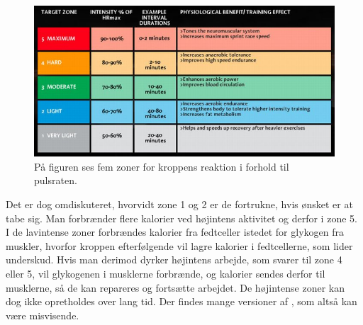 \begin{figure}[H]
	\centering
	\includegraphics[scale=1]{figures/aProblemanalyse/heart-rate-zones.jpg}
	\caption{På figuren ses fem zoner for kroppens reaktion i forhold til pulsraten.   \citep{Heartratejournal2015}}
	\label{fig:PA_Procentpuls}
\end{figure}
Det er dog omdiskuteret, hvorvidt zone 1 og 2 er de fortrukne, hvis ønsket er at tabe sig. Man forbrænder flere kalorier ved højintens aktivitet og derfor i zone 5. I de lavintense zoner forbrændes kalorier fra fedtceller istedet for glykogen fra muskler, hvorfor kroppen efterfølgende vil lagre kalorier i fedtcellerne, som lider underskud. Hvis man derimod dyrker højintens arbejde, som svarer til zone 4 eller 5, vil glykogenen i musklerne forbrænde, og kalorier sendes derfor til musklerne, så de kan repareres og fortsætte arbejdet. De højintense zoner kan dog ikke opretholdes over lang tid. Der findes mange versioner af , som altså kan være misvisende.\citep{Martini2012,Leyland2007,Heartratejournal2015} 
%
%
